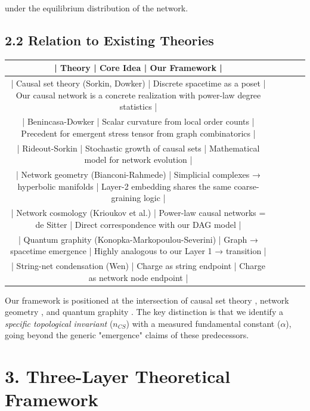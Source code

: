 \documentclass[11pt,a4paper]{article}
\theoremstyle{plain}
\theoremstyle{definition}
\begin{document}
under the equilibrium distribution of the network.

\subsection{2.2 Relation to Existing Theories}

\begin{table}[h]
\centering
\begin{tabular}{|c|c|c|c|c|}
\hline
| Theory | Core Idea | Our Framework | \\ \hline
| Causal set theory (Sorkin, Dowker) | Discrete spacetime as a poset | Our causal network is a concrete realization with power-law degree statistics \cite{Sorkin2005,Jacobson1995,Rideout1999} | \\ \hline
| Benincasa-Dowker | Scalar curvature from local order counts | Precedent for emergent stress tensor from graph combinatorics \cite{Benincasa2010} | \\ \hline
| Rideout-Sorkin | Stochastic growth of causal sets | Mathematical model for network evolution \cite{Rideout1999} | \\ \hline
| Network geometry (Bianconi-Rahmede) | Simplicial complexes → hyperbolic manifolds | Layer-2 embedding shares the same coarse-graining logic \cite{Bianconi2016} | \\ \hline
| Network cosmology (Krioukov et al.) | Power-law causal networks = de Sitter | Direct correspondence with our DAG model \cite{Krioukov2012} | \\ \hline
| Quantum graphity (Konopka-Markopoulou-Severini) | Graph → spacetime emergence | Highly analogous to our Layer 1 → transition \cite{Konopka2008} | \\ \hline
| String-net condensation (Wen) | Charge as string endpoint | Charge as network node endpoint | \\ \hline
\end{tabular}
\end{table}

Our framework is positioned at the intersection of causal set theory \cite{Sorkin2005,Jacobson1995}, network geometry \cite{Bianconi2016,Krioukov2012}, and quantum graphity \cite{Konopka2008}. The key distinction is that we identify a \textit{specific topological invariant} ($n_{CS}$) with a measured fundamental constant ($\alpha$), going beyond the generic "emergence" claims of these predecessors.

\textemdash{}

\section{3. Three-Layer Theoretical Framework}
\end{document}
